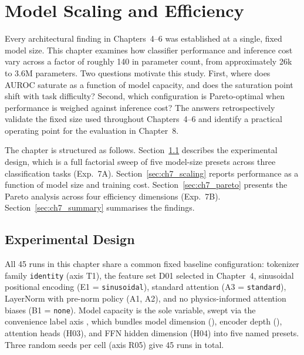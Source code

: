 \chapter{Model Scaling and Efficiency}

Every architectural finding in Chapters~4--6 was established at a single, fixed model size. This chapter examines how classifier performance and inference cost vary across a factor of roughly 140 in parameter count, from approximately 26k to 3.6M parameters. Two questions motivate this study. First, where does AUROC saturate as a function of model capacity, and does the saturation point shift with task difficulty? Second, which configuration is Pareto-optimal when performance is weighed against inference cost? The answers retrospectively validate the fixed size used throughout Chapters~4--6 and identify a practical operating point for the evaluation in Chapter~8.

The chapter is structured as follows. Section~\ref{sec:ch7_design} describes the experimental design, which is a full factorial sweep of five model-size presets across three classification tasks (Exp.~7A). Section~\ref{sec:ch7_scaling} reports performance as a function of model size and training cost. Section~\ref{sec:ch7_pareto} presents the Pareto analysis across four efficiency dimensions (Exp.~7B). Section~\ref{sec:ch7_summary} summarises the findings.

\section{Experimental Design}
\label{sec:ch7_design}

All 45 runs in this chapter share a common fixed baseline configuration: tokenizer family \texttt{identity} (axis T1), the feature set D01 selected in Chapter~4, sinusoidal positional encoding (E1 = \texttt{sinusoidal}), standard attention (A3 = \texttt{standard}), LayerNorm with pre-norm policy (A1, A2), and no physics-informed attention biases (B1 = \texttt{none}). Model capacity is the sole variable, swept via the convenience label axis , which bundles model dimension (), encoder depth (), attention heads (H03), and FFN hidden dimension (H04) into five named presets. Three random seeds per cell (axis R05) give 45 runs in total.

